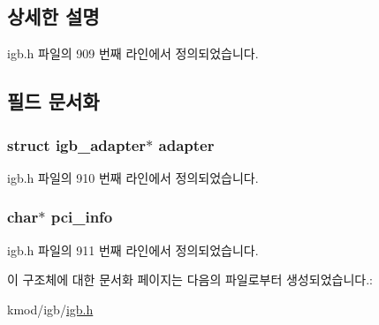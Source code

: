 \subsection{상세한 설명}


igb.\+h 파일의 909 번째 라인에서 정의되었습니다.



\subsection{필드 문서화}
\subsubsection[{\texorpdfstring{adapter}{adapter}}]{\setlength{\rightskip}{0pt plus 5cm}struct {\bf igb\+\_\+adapter}$\ast$ {\bf adapter}}\hypertarget{structigb__pci__lookup_a194d1b705839346098846e03d7ae3108}{}\label{structigb__pci__lookup_a194d1b705839346098846e03d7ae3108}


igb.\+h 파일의 910 번째 라인에서 정의되었습니다.

\subsubsection[{\texorpdfstring{pci\+\_\+info}{pci_info}}]{\setlength{\rightskip}{0pt plus 5cm}char$\ast$ pci\+\_\+info}\hypertarget{structigb__pci__lookup_a34a8460a3c4d9c1fc36e0ae255db51df}{}\label{structigb__pci__lookup_a34a8460a3c4d9c1fc36e0ae255db51df}


igb.\+h 파일의 911 번째 라인에서 정의되었습니다.



이 구조체에 대한 문서화 페이지는 다음의 파일로부터 생성되었습니다.\+:\begin{DoxyCompactItemize}
\item 
kmod/igb/\hyperlink{kmod_2igb_2igb_8h}{igb.\+h}\end{DoxyCompactItemize}
